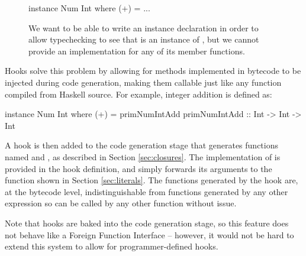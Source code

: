 \documentclass[dissertation.tex]{subfiles}
\begin{document}
{{        \begin{figure}[h]
        \begin{haskellfigure}
        instance Num Int where
            (+) = ...
        \end{haskellfigure}
        \caption{We want to be able to write an instance declaration in order to allow typechecking to see that  is an instance of , but we cannot provide an implementation for any of its member functions.}
        \end{figure}

        Hooks solve this problem by allowing for methods implemented in bytecode to be injected during code generation, making them callable just like any function compiled from Haskell source. For example, integer addition is defined as:

        \begin{haskellfigure}
        instance Num Int where
            (+) = primNumIntAdd
        primNumIntAdd :: Int -> Int -> Int
        \end{haskellfigure}

        A hook is then added to the code generation stage that generates functions named  and , as described in Section \ref{sec:closures}. The implementation of  is provided in the hook definition, and simply forwards its arguments to the  function shown in Section \ref{sec:literals}. The functions generated by the hook are, at the bytecode level, indistinguishable from functions generated by any other expression so can be called by any other function without issue.

        Note that hooks are baked into the code generation stage, so this feature does not behave like a Foreign Function Interface -- however, it would not be hard to extend this system to allow for programmer-defined hooks.
    }
}
\end{document}
